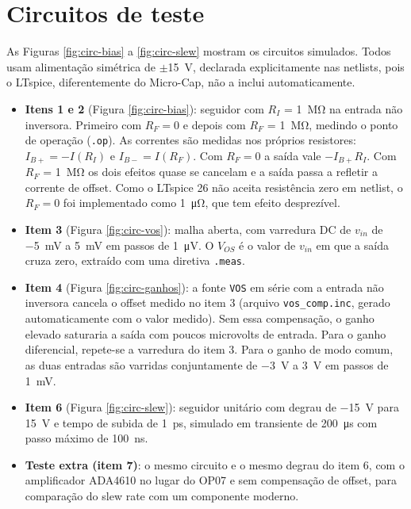 \section{Circuitos de teste}
\label{sec:circuitos}

As Figuras \ref{fig:circ-bias} a \ref{fig:circ-slew} mostram os
circuitos simulados. Todos usam alimentação simétrica de
$\pm$\SI{15}{\volt}, declarada explicitamente nas netlists, pois o
LTspice, diferentemente do Micro-Cap, não a inclui automaticamente.

\begin{itemize}
  \item \textbf{Itens 1 e 2} (Figura \ref{fig:circ-bias}): seguidor com
        $R_I$ = \SI{1}{\mega\ohm} na entrada não inversora. Primeiro com
        $R_F = 0$ e depois com $R_F$ = \SI{1}{\mega\ohm}, medindo o
        ponto de operação (\texttt{.op}). As correntes são medidas nos
        próprios resistores: $I_{B+} = -I(R_I)$ e $I_{B-} = I(R_F)$.
        Com $R_F = 0$ a saída vale $-I_{B+}R_I$. Com $R_F$ =
        \SI{1}{\mega\ohm} os dois efeitos quase se cancelam e a saída
        passa a refletir a corrente de offset. Como o LTspice 26 não aceita
        resistência zero em netlist, o $R_F = 0$ foi implementado como
        \SI{1}{\micro\ohm}, que tem efeito desprezível.
  \item \textbf{Item 3} (Figura \ref{fig:circ-vos}): malha aberta, com
        varredura DC de $v_{in}$ de \SI{-5}{\milli\volt} a
        \SI{+5}{\milli\volt} em passos de \SI{1}{\micro\volt}. O
        $V_{OS}$ é o valor de $v_{in}$ em que a saída cruza zero,
        extraído com uma diretiva \texttt{.meas}.
  \item \textbf{Item 4} (Figura \ref{fig:circ-ganhos}): a fonte
        \texttt{VOS} em série com a entrada não inversora cancela o
        offset medido no item 3 (arquivo \texttt{vos\_comp.inc}, gerado
        automaticamente com o valor medido). Sem essa compensação, o
        ganho elevado saturaria a saída com poucos microvolts de
        entrada. Para o ganho diferencial, repete-se a varredura do
        item 3. Para o ganho de modo comum, as duas entradas são
        varridas conjuntamente de \SI{-3}{\volt} a \SI{+3}{\volt} em
        passos de \SI{1}{\milli\volt}.
  \item \textbf{Item 6} (Figura \ref{fig:circ-slew}): seguidor unitário
        com degrau de \SI{-15}{\volt} para \SI{+15}{\volt} e tempo de
        subida de \SI{1}{\pico\second}, simulado em transiente de
        \SI{200}{\micro\second} com passo máximo de
        \SI{100}{\nano\second}.
  \item \textbf{Teste extra (item 7)}: o mesmo circuito e o mesmo
        degrau do item 6, com o amplificador ADA4610 no lugar do OP07 e
        sem compensação de offset, para comparação do slew rate com um
        componente moderno.
\end{itemize}

